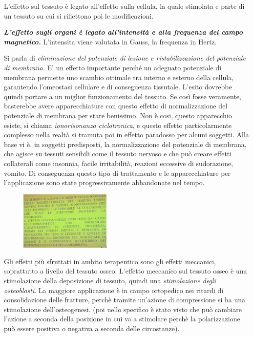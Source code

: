 L'effetto
sul tessuto è legato all'effetto sulla cellula, la quale stimolata e
parte di un tessuto su cui si riflettono poi le modificazioni.

\textbf{\emph{L'effetto sugli organi è legato all'intensità e alla
frequenza del campo magnetico.}} L'intensita viene valutata in Gauss, la
frequenza in Hertz.

Si parla di \emph{\emph{eliminazione del potenziale di lesione e
ristabilizzazione del potenziale di membrana.}} E' un effetto importante
perché un adeguato potenziale di membrana permette uno scambio ottimale
tra interno e esterno della cellula, garantendo l'omeostasi cellulare e
di conseguenza tissutale. L'esito dovrebbe quindi portare a un miglior
funzionamento del tessuto. Se così fosse veramente, basterebbe avere
apparecchiature con questo effetto di normalizzazione del potenziale di
membrana per stare benissimo. Non è cosi, questo apparecchio esiste, si
chiama \emph{ionorisonanza ciclotronica}, e questo effetto
particolarmente complesso nella realtà si tramuta poi in effetto
paradosso per alcuni soggetti. Alla base vi è, in soggetti predisposti,
la normalizzazione del potenziale di membrana, che agisce su tessuti
sensibili come il tessuto nervoso e che può creare effetti collaterali
come insonnia, facile irritabilità, reazioni eccessive di sudorazione,
vomito. Di conseguenza questo tipo di trattamento e le apparecchiature
per l'applicazione sono state progressivamente abbandonate nel tempo.

\begin{figure}[!ht]
\centering
\includegraphics[width=0.4\textwidth]{026/image1.png}
\end{figure}

Gli
effetti più sfruttati in ambito terapeutico sono gli effetti meccanici,
soprattutto a livello del tessuto osseo. L'effetto meccanico sul tessuto
osseo è una stimolazione della deposizione di tessuto, quindi una
\emph{\emph{stimolazione degli osteoblasti}}. La maggiore applicazione è
in campo ortopedico nei ritardi di consolidazione delle fratture, perchè
tramite un'azione di compressione si ha una stimolazione
dell'osteogenesi. (poi nello specifico è stato visto che può cambiare
l'azione a seconda della posizione in cui va a stimolare perchè la
polarizzazione può essere positiva o negativa a seconda delle
circostanze).

